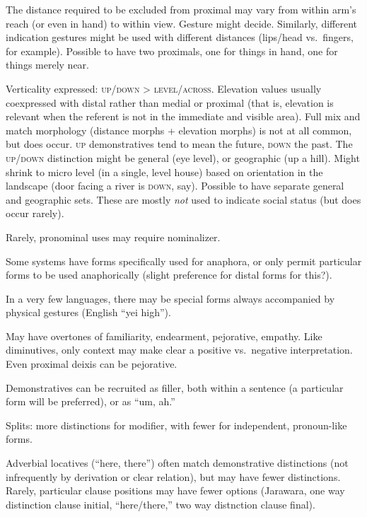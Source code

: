 \documentclass[11pt]{article}
\newcommand{\I}[1]{\textsc{#1}}   %
\begin{document}
The distance required to be excluded from proximal may vary from
within arm's reach (or even in hand) to within view.  Gesture might
decide.  Similarly, different indication gestures might be used with
different distances (lips/head vs.\ fingers, for example).  Possible
to have two proximals, one for things in hand, one for things merely
near.

Verticality expressed: \I{up/down} > \I{level/across}.  Elevation
values usually coexpressed with distal rather than medial or proximal
(that is, elevation is relevant when the referent is not in the
immediate and visible area).  Full mix and match morphology (distance
morphs + elevation morphs) is not at all common, but does occur.
\I{up} demonstratives tend to mean the future, \I{down} the past.  The
\I{up/down} distinction might be general (eye level), or geographic
(up a hill).  Might shrink to micro level (in a single, level house)
based on orientation in the landscape (door facing a river is
\I{down}, say).  Possible to have separate general and geographic
sets.  These are mostly \textit{not} used to indicate social status
(but does occur rarely).

Rarely, pronominal uses may require nominalizer.

Some systems have forms specifically used for anaphora, or only permit
particular forms to be used anaphorically (slight preference for
distal forms for this?).

In a very few languages, there may be special forms always accompanied
by physical gestures (English ``yei high'').

May have overtones of familiarity, endearment, pejorative,
empathy.  Like diminutives, only context may make clear a positive
vs.\ negative interpretation.  Even proximal deixis can be
pejorative. 

Demonstratives can be recruited as filler, both within a sentence (a
particular form will be preferred), or as ``um, ah.''

Splits: more distinctions for modifier, with fewer for independent,
pronoun-like forms. 

Adverbial locatives (``here, there'') often match demonstrative
distinctions (not infrequently by derivation or clear relation), but
may have fewer distinctions.  Rarely, particular clause positions may
have fewer options (Jarawara, one way distinction clause initial,
``here/there,'' two way distnction clause final).
\end{document}
